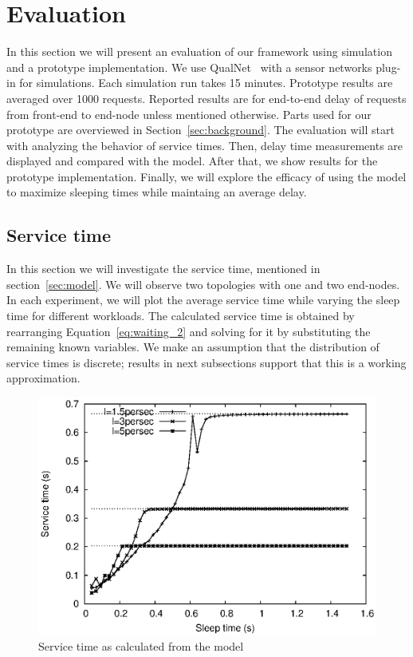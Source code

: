 \section{Evaluation}

In this section we will present an evaluation of our framework using simulation and a prototype implementation. We use QualNet~\cite{qualnet} with a sensor networks plug-in for simulations. Each simulation run takes 15 minutes. Prototype results are averaged over 1000 requests. Reported results are for end-to-end delay of requests from front-end to end-node unless mentioned otherwise. Parts used for our prototype are overviewed in Section~\ref{sec:background}. The evaluation will start with analyzing the behavior of service times. Then, delay time measurements are displayed and compared with the model. After that, we show results for the prototype implementation. Finally, we will explore the efficacy of using the model to maximize sleeping times while maintaing an average delay.

\subsection{Service time}
In this section we will investigate the service time, mentioned in section~\ref{sec:model}. We will observe two topologies with one and two end-nodes. In each experiment, we will plot the average service time while varying the sleep time for different workloads. The calculated service time is obtained by rearranging Equation~\ref{eq:waiting_2} and solving for it by substituting the remaining known variables. We make an assumption that the distribution of service times is discrete; results in next subsections support that this is a working approximation. 

\begin{figure}[t]
\centering
\includegraphics[scale=0.65]{figures/3node_varySleep_sim_x.eps}
\caption{Service time as calculated from the model}
\label{fig:3nodes_x}
\end{figure}

